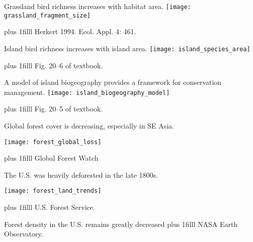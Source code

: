 \documentclass[t]{beamer}
\newcommand\imagecredit[1]{%
	\vskip0pt plus 1filll \tiny #1}%
\begin{document}

{
\begin{frame}[t,plain]{Grassland bird richness increases with habitat area.}
	\centering
		\texttt{[image: grassland\_fragment\_size]}

	\imagecredit{\hfill Herkert 1994. Ecol. Appl. 4: 461.}
\end{frame}
}


{
\begin{frame}[t,plain]{Island bird richness increases with island area.}
	\centering
		\texttt{[image: island\_species\_area]}

	\imagecredit{\hfill Fig. 20–6 of textbook.}
\end{frame}
}

{
\begin{frame}[t,plain]{A model of island biogeography provides a framework for conservation management.}
	\centering
		\texttt{[image: island\_biogeography\_model]}

	\imagecredit{\hfill Fig. 20–5 of textbook.}
\end{frame}
}


{

\begin{frame}[t,plain]{Global forest cover is decreasing, especially in SE Asia.}
	\begin{center}
		\texttt{[image: forest\_global\_loss]}
	\end{center}	
	\imagecredit{Global Forest Watch}
\end{frame}
}

{
\begin{frame}[t,plain]{The U.S. was heavily deforested in the late 1800s.}
	\begin{center}
		\texttt{[image: forest\_land\_trends]}
	\end{center}	
	\imagecredit{U.S. Forest Service.}
\end{frame}
}

{
\begin{frame}[t,plain]{Forest density in the U.S. remains greatly decreased}
	\imagecredit{\hfill NASA Earth Observatory.}
\end{frame}
}

\end{document}
